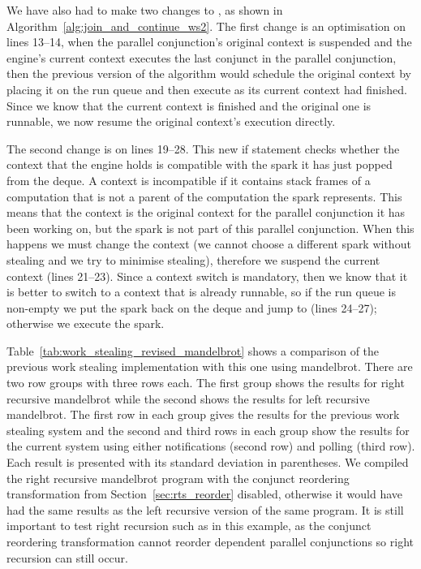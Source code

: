 We have also had to make two changes to \joinandcontinue,
as shown in Algorithm~\ref{alg:join_and_continue_ws2}.
The first change is an optimisation on lines 13--14,
when the parallel conjunction's original context is suspended
and the engine's current context executes the last conjunct in the parallel
conjunction,
then the previous version of the algorithm would schedule the original
context by placing it on the run queue and then execute \idle as its current
context had finished.
Since we know that the current context is finished and the original one is
runnable,
we now resume the original context's execution directly.

The second change is on lines 19--28.
This new if statement checks whether the context that the engine holds is
compatible with the spark it has just popped from the deque.
A context is incompatible if it contains stack frames of a computation that
is not a parent of the computation the spark represents.
This means that the context is the original context for the parallel
conjunction it has been working on,
but the spark is not part of this parallel conjunction.
When this happens we must change the context
(we cannot choose a different spark without stealing and we try to minimise
stealing),
therefore we suspend the current context (lines 21--23).
Since a context switch is mandatory, then we know that it is better to
switch to a context that is already runnable,
so if the run queue is non-empty we put the spark back on the deque and jump
to \idle (lines 24--27);
otherwise we execute the spark.



Table~\ref{tab:work_stealing_revised_mandelbrot} shows a comparison of the previous
work stealing implementation with this one using mandelbrot.
There are two row groups with three rows each.
The first group shows the results for right recursive mandelbrot while the
second shows the results for left recursive mandelbrot.
The first row in each group gives the results for the previous work stealing
system and
the second and third rows in each group show the results for the current
system using either notifications (second row) and polling (third row).
Each result is presented with its standard deviation in parentheses.
We compiled the right recursive mandelbrot program with the conjunct
reordering transformation from Section~\ref{sec:rts_reorder} disabled,
otherwise it would have had the same results as the left recursive version
of the same program.
It is still important to test right recursion such as in this example,
as the conjunct reordering transformation cannot reorder dependent parallel
conjunctions so right recursion can still occur.


